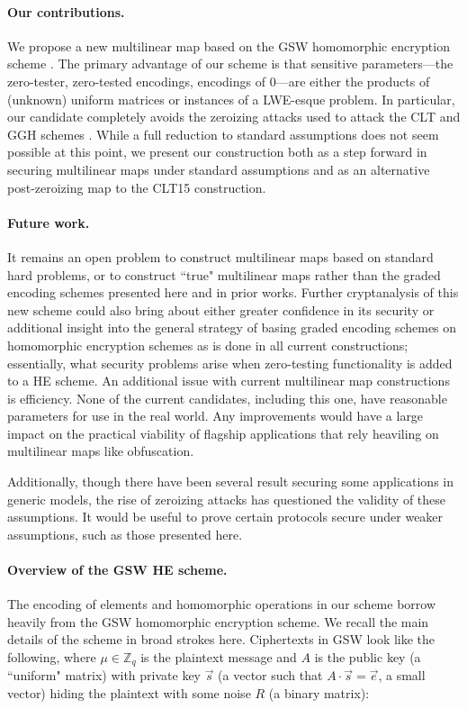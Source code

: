\paragraph{Our contributions.}  We propose a new multilinear map based on the GSW homomorphic encryption scheme \cite{gsw}.  The primary advantage of our scheme is that sensitive parameters---the zero-tester, zero-tested encodings, encodings of $0$---are either the products of (unknown) uniform matrices or instances of a LWE-esque problem.  In particular, our candidate completely avoids the zeroizing attacks used to attack the CLT and GGH schemes \cite{chl, cgh, hj}.  While a full reduction to standard assumptions does not seem possible at this point, we present our construction both as a step forward in securing multilinear maps under standard assumptions and as an alternative post-zeroizing map to the CLT15 construction.

\paragraph{Future work.}  It remains an open problem to construct multilinear maps based on standard hard problems, or to construct ``true" multilinear maps rather than the graded encoding schemes presented here and in prior works.  Further cryptanalysis of this new scheme could also bring about either greater confidence in its security or additional insight into the general strategy of basing graded encoding schemes on homomorphic encryption schemes as is done in all current constructions; essentially, what security problems arise when zero-testing functionality is added to a HE scheme.  An additional issue with current multilinear map constructions is efficiency.  None of the current candidates, including this one, have reasonable parameters for use in the real world.  Any improvements would have a large impact on the practical viability of flagship applications that rely heaviling on multilinear maps like obfuscation.

Additionally, though there have been several result securing some applications in generic models, the rise of zeroizing attacks has questioned the validity of these assumptions.  It would be useful to prove certain protocols secure under weaker assumptions, such as those presented here.

\paragraph{Overview of the GSW HE scheme.}  The encoding of elements and homomorphic operations in our scheme borrow heavily from the GSW homomorphic encryption scheme.  We recall the main details of the scheme in broad strokes here.  Ciphertexts in GSW look like the following, where $\mu \in \mathbb{Z}_q$ is the plaintext message and $A$ is the public key (a ``uniform" matrix) with private key $\vec{s}$ (a vector such that $A\cdot \vec{s} = \vec{e}$, a small vector) hiding the plaintext with some noise $R$ (a binary matrix):

